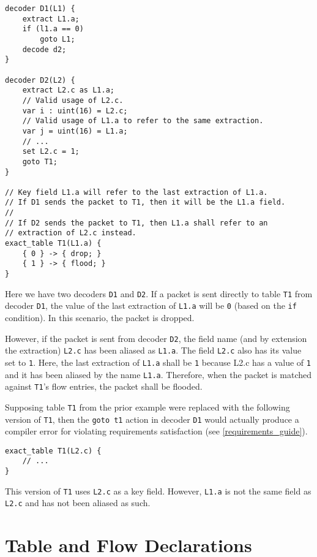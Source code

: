 \begin{minip}
\begin{lstlisting}
decoder D1(L1) {
	extract L1.a;
	if (l1.a == 0)
		goto L1;
	decode d2;
}

decoder D2(L2) {
	extract L2.c as L1.a;
	// Valid usage of L2.c.
	var i : uint(16) = L2.c;
	// Valid usage of L1.a to refer to the same extraction.
	var j = uint(16) = L1.a;
	// ...
	set L2.c = 1;
	goto T1;
}

// Key field L1.a will refer to the last extraction of L1.a.
// If D1 sends the packet to T1, then it will be the L1.a field.
// 
// If D2 sends the packet to T1, then L1.a shall refer to an
// extraction of L2.c instead.
exact_table T1(L1.a) {
	{ 0 } -> { drop; }
	{ 1 } -> { flood; }
}
\end{lstlisting}
\end{minip}

Here we have two decoders \texttt{D1} and \texttt{D2}. If a packet is sent directly to table \texttt{T1} from decoder \texttt{D1}, the value of the last extraction of \texttt{L1.a} will be \texttt{0} (based on the \texttt{if} condition). In this scenario, the packet is dropped. 

However, if the packet is sent from decoder \texttt{D2}, the field name (and by extension the extraction) \texttt{L2.c} has been aliased as \texttt{L1.a}. The field \texttt{L2.c} also has its value set to \texttt{1}. Here, the last extraction of \texttt{L1.a} shall be \texttt{1} because L2.c has a value of \texttt{1} and it has been aliased by the name \texttt{L1.a}. Therefore, when the packet is matched against \texttt{T1}'s flow entries, the packet shall be flooded.

Supposing table \texttt{T1} from the prior example were replaced with the following version of \texttt{T1}, then the \texttt{goto t1} action in decoder \texttt{D1} would actually produce a compiler error for violating requirements satisfaction (see \ref{requirements_guide}). 

\begin{minip}
\begin{lstlisting}
exact_table T1(L2.c) {
	// ...
}
\end{lstlisting}
\end{minip}

This version of \texttt{T1} uses \texttt{L2.c} as a key field. However, \texttt{L1.a} is not the same field as \texttt{L2.c} and has not been aliased as such.

\section{Table and Flow Declarations} \label{table_guide}

